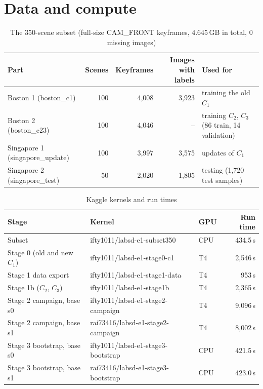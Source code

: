 \documentclass[10pt,a4paper]{article}
\begin{document}
\FloatBarrier
\section{Data and compute}
\begin{table}[h]\centering\small
\caption{The 350-scene subset (full-size CAM\_FRONT keyframes, 4.645\,GB in total, 0 missing images)}
\begin{tabular}{lrrrl}\toprule
Part & Scenes & Keyframes & Images with labels & Used for\\\midrule
Boston 1 (boston\_c1) & 100 & 4{,}008 & 3{,}923 & training the old $C_1$\\
Boston 2 (boston\_c23) & 100 & 4{,}046 & -- & training $C_2$, $C_3$ (86 train, 14 validation)\\
Singapore 1 (singapore\_update) & 100 & 3{,}997 & 3{,}575 & updates of $C_1$\\
Singapore 2 (singapore\_test) & 50 & 2{,}020 & 1{,}805 & testing (1{,}720 test samples)\\\bottomrule
\end{tabular}\end{table}

\begin{table}[h]\centering\small
\caption{Kaggle kernels and run times}
\begin{tabular}{lllr}\toprule
Stage & Kernel & GPU & Run time\\\midrule
Subset & ifty1011/labsd-e1-subset350 & CPU & 434.5\,s\\
Stage 0 (old and new $C_1$) & ifty1011/labsd-e1-stage0-c1 & T4 & 2{,}546\,s\\
Stage 1 data export & ifty1011/labsd-e1-stage1-data & T4 & 953\,s\\
Stage 1b ($C_2$, $C_3$) & ifty1011/labsd-e1-stage1b & T4 & 2{,}365\,s\\
Stage 2 campaign, base s0 & ifty1011/labsd-e1-stage2-campaign & T4 & 9{,}096\,s\\
Stage 2 campaign, base s1 & rai73416/labsd-e1-stage2-campaign & T4 & 8{,}002\,s\\
Stage 3 bootstrap, base s0 & ifty1011/labsd-e1-stage3-bootstrap & CPU & 421.5\,s\\
Stage 3 bootstrap, base s1 & rai73416/labsd-e1-stage3-bootstrap & CPU & 423.0\,s\\\bottomrule
\end{tabular}\end{table}

\FloatBarrier
\end{document}
